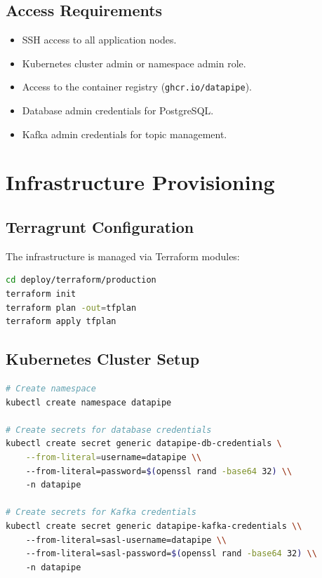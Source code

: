 \documentclass[
    language=english,
    doctype=manual,
    institution=none,
    titlestyle=book,
    oneside,
]{../../omnilatex}
\begin{document}
\section{Access Requirements}

\begin{itemize}
    \item SSH access to all application nodes.
    \item Kubernetes cluster admin or namespace admin role.
    \item Access to the container registry (\texttt{ghcr.io/datapipe}).
    \item Database admin credentials for PostgreSQL.
    \item Kafka admin credentials for topic management.
\end{itemize}

\chapter{Infrastructure Provisioning}
\label{sec:provisioning}

\section{Terragrunt Configuration}

The infrastructure is managed via Terraform modules:

\begin{lstlisting}[language=bash, caption={Terraform init and apply.}]
cd deploy/terraform/production
terraform init
terraform plan -out=tfplan
terraform apply tfplan
\end{lstlisting}

\section{Kubernetes Cluster Setup}

\begin{lstlisting}[language=bash, caption={Kubernetes namespace and secrets setup.}]
# Create namespace
kubectl create namespace datapipe

# Create secrets for database credentials
kubectl create secret generic datapipe-db-credentials \
    --from-literal=username=datapipe \\
    --from-literal=password=$(openssl rand -base64 32) \\
    -n datapipe

# Create secrets for Kafka credentials
kubectl create secret generic datapipe-kafka-credentials \\
    --from-literal=sasl-username=datapipe \\
    --from-literal=sasl-password=$(openssl rand -base64 32) \\
    -n datapipe
\end{lstlisting}
\end{document}
